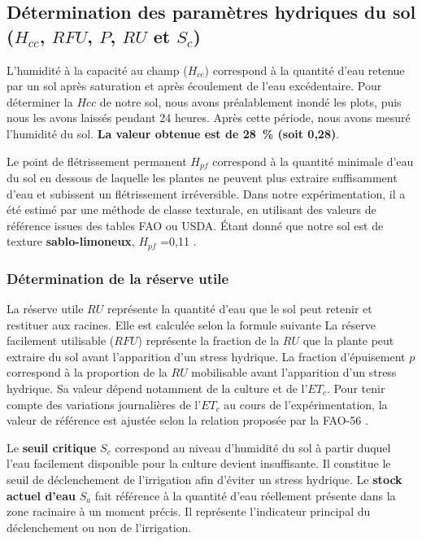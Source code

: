 \subsection{Détermination des paramètres hydriques du sol (\texorpdfstring{$H_{cc}$, $RFU$, $P$, $RU$}{Hcc, RFU, P, RU} et \texorpdfstring{$S_c$}{Sc})}
L’humidité à la capacité au champ ($H_{cc}$) correspond à la quantité d’eau retenue par un sol après saturation et après écoulement de l’eau excédentaire. 
Pour déterminer la $Hcc$ de notre sol, nous avons préalablement inondé les plots, puis nous les avons laissés pendant 24 heures. Après cette période, nous avons mesuré l’humidité du sol. \textbf{La valeur obtenue est de 28~\% (soit 0,28)}.

Le point de flétrissement permanent $H_{pf}$ correspond à la quantité minimale d’eau du sol en dessous de laquelle les plantes ne peuvent plus extraire suffisamment d’eau et subissent un flétrissement irréversible. Dans notre expérimentation, il a été estimé par une méthode de classe texturale, en utilisant des valeurs de référence issues des tables FAO ou USDA. Étant donné que notre sol est de texture \textbf{sablo-limoneux}, $H_{pf}$ =0,11 \cite[chap.~7,Table.~19]{allen_crop_1998-1}.

\subsubsection{Détermination de la réserve utile}
La réserve utile $RU$ représente la quantité d’eau que le sol peut retenir et restituer aux racines. Elle est calculée selon la formule suivante \cite[chap.~8]{allen_crop_1998-1}
La réserve facilement utilisable ($RFU$) représente la fraction de la $RU$ que la plante peut extraire du sol avant l’apparition d’un stress hydrique. 
La fraction d’épuisement $p$ correspond à la proportion de la $RU$ mobilisable avant l’apparition d’un stress hydrique. Sa valeur dépend notamment de la culture et de l’$ET_c$. 
Pour tenir compte des variations journalières de l’$ET_c$ au cours de l’expérimentation, la valeur de référence est ajustée selon la relation proposée par la FAO-56 \cite{allen_crop_1998-1}.

Le \textbf{seuil critique} $S_c$ correspond au niveau d’humidité du sol à partir duquel l’eau facilement disponible pour la culture devient insuffisante. Il constitue le seuil de déclenchement de l’irrigation afin d’éviter un stress hydrique. 
Le \textbf{stock actuel d’eau} $S_a$ fait référence à la quantité d’eau réellement présente dans la zone racinaire à un moment précis. Il représente l’indicateur principal du déclenchement ou non de l’irrigation.

